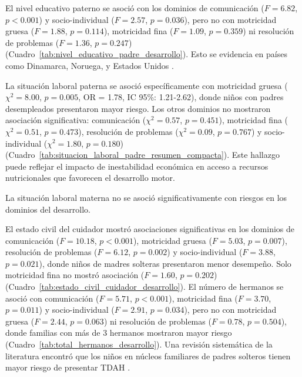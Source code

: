 El nivel educativo paterno se asoció con los dominios de comunicación
($F = 6.82$, $p < 0.001$) y socio-individual 
($F = 2.57$, $p = 0.036$), pero no con motricidad gruesa ($F = 1.88$, 
$p = 0.114$), motricidad fina ($F = 1.09$, $p = 0.359$) ni resolución de 
problemas ($F = 1.36$, $p = 0.247$) 
(Cuadro~\ref{tab:nivel_educativo_padre_desarrollo}). Esto se evidencia en países
como Dinamarca, Noruega, y Estados Unidos
\cite{Holstein2021,Torvik2020,Sauver2004}.

La situación laboral paterna se asoció específicamente con motricidad gruesa 
($\chi^2 = 8.00$, $p = 0.005$, OR = 1.78, IC 95\%: 1.21-2.62), donde niños 
con padres desempleados presentaron mayor riesgo. Los otros dominios no 
mostraron asociación significativa: comunicación ($\chi^2 = 0.57$, $p = 0.451$), 
motricidad fina ($\chi^2 = 0.51$, $p = 0.473$), resolución de problemas 
($\chi^2 = 0.09$, $p = 0.767$) y socio-individual ($\chi^2 = 1.80$, 
$p = 0.180$) (Cuadro~\ref{tab:situacion_laboral_padre_resumen_compacta}). 
Este hallazgo puede reflejar el impacto de inestabilidad económica en 
acceso a recursos nutricionales que favorecen el desarrollo motor.

La situación laboral materna no se asoció significativamente con riesgos en los
dominios del desarrollo.

El estado civil del cuidador mostró asociaciones significativas en los dominios
de comunicación ($F = 10.18$, $p < 0.001$), motricidad gruesa
($F = 5.03$, $p = 0.007$), 
resolución de problemas ($F = 6.12$, $p = 0.002$) y socio-individual 
($F = 3.88$, $p = 0.021$), donde niños de madres solteras presentaron 
menor desempeño. Solo motricidad fina no mostró asociación ($F = 1.60$, 
$p = 0.202$) (Cuadro~\ref{tab:estado_civil_cuidador_desarrollo}). El número 
de hermanos se asoció con comunicación ($F = 5.71$, $p < 0.001$), motricidad 
fina ($F = 3.70$, $p = 0.011$) y socio-individual ($F = 2.91$, $p = 0.034$), 
pero no con motricidad gruesa ($F = 2.44$, $p = 0.063$) ni resolución de 
problemas ($F = 0.78$, $p = 0.504$), donde familias con más de 3 hermanos 
mostraron mayor riesgo (Cuadro~\ref{tab:total_hermanos_desarrollo}).
Una revisión sistemática de la literatura encontró que los niños en núcleos
familiares de padres solteros tienen mayor riesgo de presentar TDAH
\cite{Claussen2022}.

